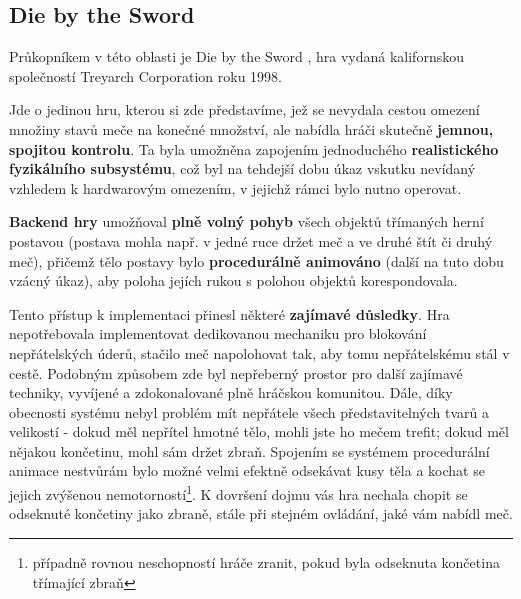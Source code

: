 \subsection{Die by the Sword}

Průkopníkem v této oblasti je Die by the Sword \cite{DieByTheSword}, hra vydaná kalifornskou společností Treyarch Corporation roku 1998. 

Jde o jedinou hru, kterou si zde představíme, jež se nevydala cestou omezení množiny stavů meče na konečné množství, ale nabídla hráči skutečně \textbf{jemnou, spojitou kontrolu}. Ta byla umožněna zapojením jednoduchého \textbf{realistického fyzikálního subsystému}, což byl na tehdejší dobu úkaz vskutku nevídaný vzhledem k hardwarovým omezením, v jejichž rámci bylo nutno operovat.

\textbf{Backend hry} umožňoval \textbf{plně volný pohyb} všech objektů třímaných herní postavou (postava mohla např. v jedné ruce držet meč a ve druhé štít či druhý meč), přičemž tělo postavy bylo \textbf{procedurálně animováno} (další na tuto dobu vzácný úkaz), aby poloha jejích rukou s polohou objektů korespondovala.

Tento přístup k implementaci přinesl některé \textbf{zajímavé důsledky}. Hra nepotřebovala implementovat dedikovanou mechaniku pro blokování nepřátelských úderů, stačilo meč napolohovat tak, aby tomu nepřátelskému stál v cestě. Podobným způsobem zde byl nepřeberný prostor pro další zajímavé techniky, vyvíjené a zdokonalované plně hráčskou komunitou. Dále, díky obecnosti systému nebyl problém mít nepřátele všech představitelných tvarů a velikostí - dokud měl nepřítel hmotné tělo, mohli jste ho mečem trefit; dokud měl nějakou končetinu, mohl sám držet zbraň. Spojením se systémem procedurální animace nestvůrám bylo možné velmi efektně odsekávat kusy těla a kochat se jejich zvýšenou nemotorností\footnote{případně rovnou neschopností hráče zranit, pokud byla odseknuta končetina třímající zbraň}. K dovršení dojmu vás hra nechala chopit se odseknuté končetiny jako zbraně, stále při stejném ovládání, jaké vám nabídl meč.

